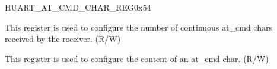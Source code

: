 \begin{register}{H}{UART\_AT\_CMD\_CHAR\_REG}{0x54}\label{regdesc:UARTATCMDCHARREG}
%
%
%
\regnewline%
\begin{regdesc}\begin{reglist}
\item [UART\_CHAR\_NUM]This register is used to configure the number of continuous at\_cmd chars received by the receiver. (R/W)
\item [UART\_AT\_CMD\_CHAR]This register is used to configure the content of an at\_cmd char. (R/W)
\end{reglist}\end{regdesc}
\end{register}


